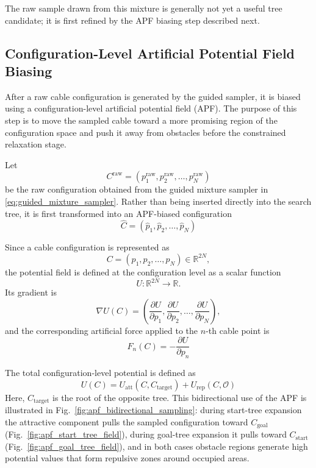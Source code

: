 \documentclass{pas}
\begin{document}
The raw sample drawn from this mixture is generally not yet a useful tree
candidate; it is first refined by the APF biasing step described next.
\subsection{Configuration-Level Artificial Potential Field Biasing}
\label{subsec:gcr_config_apf_sampling}

After a raw cable configuration is generated by the guided sampler, it is biased
using a configuration-level artificial potential field (APF). The purpose of
this step is to move the sampled cable toward a more promising region of the
configuration space and push it away from obstacles before the constrained relaxation stage.

Let
\[
C^{\mathrm{raw}}
=
(p_1^{\mathrm{raw}},p_2^{\mathrm{raw}},\ldots,p_N^{\mathrm{raw}})
\]
be the raw configuration obtained from the guided mixture sampler in
\eqref{eq:guided_mixture_sampler}. Rather than being inserted directly into the search tree, it is first transformed into an APF-biased configuration
\[
\widehat{C}
=
(\widehat{p}_1,\widehat{p}_2,\ldots,\widehat{p}_N)
\]

Since a cable configuration is represented as
\begin{equation}
C
=
(p_1,p_2,\ldots,p_N)
\in
\mathbb{R}^{2N},
\label{eq:gcr_configuration_for_apf}
\end{equation}
the potential field is defined at the configuration level as a scalar function
\begin{equation}
U:\mathbb{R}^{2N}\rightarrow\mathbb{R}.
\label{eq:gcr_apf_mapping}
\end{equation}
Its gradient is
\begin{equation}
\nabla U(C)
=
\left(
\frac{\partial U}{\partial p_1},
\frac{\partial U}{\partial p_2},
\ldots,
\frac{\partial U}{\partial p_N}
\right),
\label{eq:gcr_apf_gradient_definition}
\end{equation}
and the corresponding artificial force applied to the $n$-th cable point is
\begin{equation}
F_n(C)
=
-
\frac{\partial U}{\partial p_n}
\label{eq:gcr_pointwise_apf_force}
\end{equation}

The total configuration-level potential is defined as
\begin{equation}
U(C)
=
U_{\mathrm{att}}(C,C_{\mathrm{target}})
+
U_{\mathrm{rep}}(C,\mathcal{O})
\label{eq:gcr_total_configuration_potential}
\end{equation}
Here, $C_{\mathrm{target}}$ is the root of the opposite tree. This bidirectional use of the APF is illustrated in Fig.~\ref{fig:apf_bidirectional_sampling}: during start-tree expansion the attractive component pulls the sampled configuration toward $C_{\mathrm{goal}}$ (Fig.~\ref{fig:apf_start_tree_field}), during goal-tree expansion it pulls toward $C_{\mathrm{start}}$ (Fig.~\ref{fig:apf_goal_tree_field}), and in both cases obstacle regions generate high potential values that form repulsive zones around occupied areas.
\end{document}
